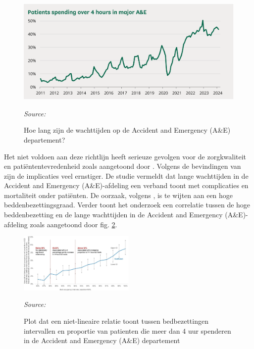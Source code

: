 \begin{figure}[h]
    \centering
    \includegraphics[width=1\linewidth]{img/Figuur-1.png}
    \caption{Hoe lang zijn de wachttijden op de Accident and Emergency (A\&E) departement?}
    \label{fig:Figuur1}
    \textit{Source: \autocite{Baker2024}}
\end{figure}

Het niet voldoen aan deze richtlijn heeft serieuze gevolgen voor de zorgkwaliteit en patiëntentevredenheid zoals aangetoond door \autocite{Vainieri2020}. Volgens de bevindingen van \autocite{Paling2020} zijn de implicaties veel ernstiger. De studie vermeldt dat lange wachttijden in de Accident and Emergency (A\&E)-afdeling een verband toont met complicaties en mortaliteit onder patiënten. De oorzaak, volgens \autocite{Paling2020}, is te wijten aan een hoge beddenbezettingsgraad. Verder toont het onderzoek een correlatie tussen de hoge beddenbezetting  en de lange wachttijden in de Accident and Emergency (A\&E)-afdeling zoals aangetoond door fig. \ref{fig:Figuur2}.

\begin{figure}[h]
    \centering
    \includegraphics[width=0.5\textwidth]{img/Figuur-2}
    \caption{Plot dat een niet-lineaire relatie toont tussen bedbezettingen intervallen en proportie van patienten die meer dan 4 uur spenderen in de Accident and Emergency (A\&E) departement}
    \label{fig:Figuur2}
    \textit{Source: \autocite{Paling2020}}
\end{figure}

